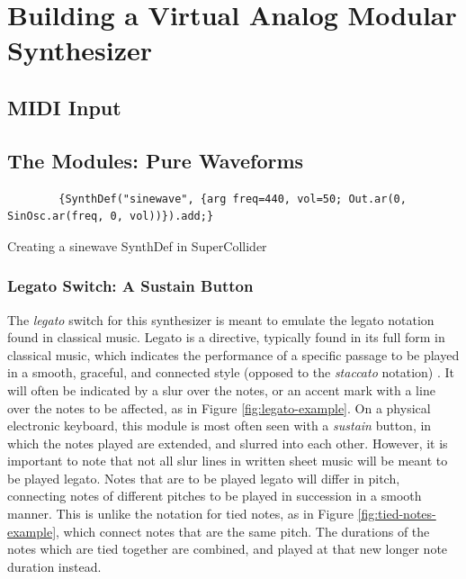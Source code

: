 \chapter[Modular Synthesizer]{Building a Virtual Analog Modular Synthesizer}\label{chapter:building-a-mod-synth}


\section{MIDI Input}\label{section:midi-input}

\section{The Modules: Pure Waveforms}

\begin{listing}
	\begin{lstlisting}
		{SynthDef("sinewave", {arg freq=440, vol=50; Out.ar(0, SinOsc.ar(freq, 0, vol))}).add;}
	\end{lstlisting}
	\caption{Creating a sinewave SynthDef in SuperCollider}
	\label{lst:sinewave-synthdef}
\end{listing}

\subsection{Legato Switch: A Sustain Button}

The \textit{legato} switch for this synthesizer is meant to emulate the legato notation found in classical music. Legato is a directive, typically found in its full form in classical music, which indicates the performance of a specific passage to be played in a smooth, graceful, and connected style (opposed to the \textit{staccato} notation) \cite{Winer_2018}. It will often be indicated by a slur over the notes, or an accent mark with a line over the notes to be affected, as in Figure \ref{fig:legato-example}. On a physical electronic keyboard, this module is most often seen with a \textit{sustain} button, in which the notes played are extended, and slurred into each other. However, it is important to note that not all slur lines in written sheet music will be meant to be played legato. Notes that are to be played legato will differ in pitch, connecting notes of different pitches to be played in succession in a smooth manner. This is unlike the notation for tied notes, as in Figure \ref{fig:tied-notes-example}, which connect notes that are the same pitch. The durations of the notes which are tied together are combined, and played at that new longer note duration instead.

